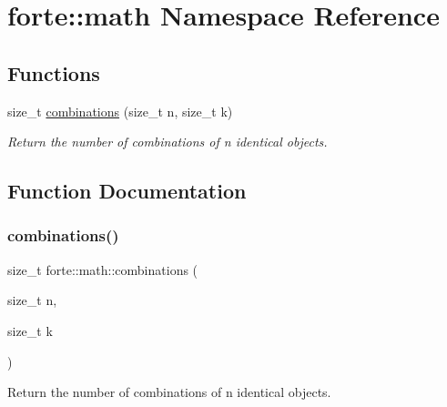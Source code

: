 \hypertarget{namespaceforte_1_1math}{}\section{forte\+:\+:math Namespace Reference}
\label{namespaceforte_1_1math}
\subsection*{Functions}
\begin{DoxyCompactItemize}
\item 
size\+\_\+t \mbox{\hyperlink{namespaceforte_1_1math_ac8f402cf92ce9d2a3c4f9be0e293118a}{combinations}} (size\+\_\+t n, size\+\_\+t k)
\begin{DoxyCompactList}\small\item\em Return the number of combinations of n identical objects. \end{DoxyCompactList}\end{DoxyCompactItemize}


\subsection{Function Documentation}
\mbox{\label{namespaceforte_1_1math_ac8f402cf92ce9d2a3c4f9be0e293118a}} 
\subsubsection{\texorpdfstring{combinations()}{combinations()}}
{\footnotesize\ttfamily size\+\_\+t forte\+::math\+::combinations (\begin{DoxyParamCaption}\item[{size\+\_\+t}]{n,  }\item[{size\+\_\+t}]{k }\end{DoxyParamCaption})}



Return the number of combinations of n identical objects. 

